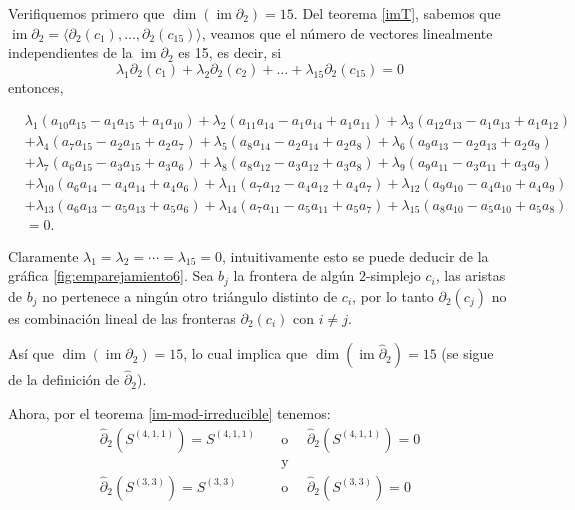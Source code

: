 \documentclass[12pt]{book}
\theoremstyle{definition}
\DeclareMathOperator{\im}{im}
\newcounter{in}
\newcounter{ini}
\begin{document}
Verifiquemos primero que $\dim(\im \partial_{2})=15$. Del teorema
\ref{imT}, sabemos que $\im \partial_{2}=\langle\partial_{2}(c_{1}),\ldots,\partial_{2}(c_{15})\rangle$,
veamos que el número de vectores linealmente independientes de la
$\im \partial_{2}$ es 15, es decir, si
$$\lambda_{1}\partial_{2}(c_{1})+\lambda_{2}\partial_{2}(c_{2})+\ldots+\lambda_{15}\partial_{2}(c_{15})=0$$
entonces,
\begin{footnotesize}
  \begin{align*}
    &\lambda_{1}(a_{10}a_{15}-a_{1}a_{15}+a_{1}a_{10})+\lambda_{2}(a_{11}a_{14}-a_{1}a_{14}+a_{1}a_{11})+\lambda_{3}(a_{12}a_{13}-a_{1}a_{13}+a_{1}a_{12})\\
    &+\lambda_{4}(a_{7}a_{15}-a_{2}a_{15}+a_{2}a_{7})+\lambda_{5}(a_{8}a_{14}-a_{2}a_{14}+a_{2}a_{8})+\lambda_{6}(a_{9}a_{13}-a_{2}a_{13}+a_{2}a_{9})\\
    &+\lambda_{7}(a_{6}a_{15}-a_{3}a_{15}+a_{3}a_{6})+\lambda_{8}(a_{8}a_{12}-a_{3}a_{12}+a_{3}a_{8})+\lambda_{9}(a_{9}a_{11}-a_{3}a_{11}+a_{3}a_{9})\\
    &+\lambda_{10}(a_{6}a_{14}-a_{4}a_{14}+a_{4}a_{6})+\lambda_{11}(a_{7}a_{12}-a_{4}a_{12}+a_{4}a_{7})+\lambda_{12}(a_{9}a_{10}-a_{4}a_{10}+a_{4}a_{9})\\
    &+\lambda_{13}(a_{6}a_{13}-a_{5}a_{13}+a_{5}a_{6})+\lambda_{14}(a_{7}a_{11}-a_{5}a_{11}+a_{5}a_{7})+\lambda_{15}(a_{8}a_{10}-a_{5}a_{10}+a_{5}a_{8})\\
    &=0.
  \end{align*}
\end{footnotesize}
Claramente $\lambda_{1}=\lambda_{2}=\cdots=\lambda_{15}=0$,
intuitivamente esto se puede deducir de la gráfica
\ref{fig:emparejamiento6}. Sea $b_{j}$ la frontera de algún $2$-simplejo $c_{i}$, las aristas
de $b_{j}$ no pertenece a ningún otro triángulo distinto de $c_{i}$, por
lo tanto $\partial_{2}(c_{j})$ no es combinación lineal de las fronteras
$\partial_{2}(c_{i})$ con $i\neq j$.

Así que $\dim(\im\partial_{2})=15$, lo cual implica que
$\dim(\im\widehat\partial_{2})=15$ (se sigue de la definición de
$\widehat\partial_{2}$).

Ahora, por el teorema \ref{im-mod-irreducible} tenemos:
\begin{align*}
  \widehat\partial_{2}(S^{(4,1,1)})=S^{(4,1,1)} \quad &\mbox{o }\quad \widehat\partial_{2}(S^{(4,1,1)})=0\\
  &\mbox{y}\\
  \widehat\partial_{2}(S^{(3,3)})=S^{(3,3)} \quad &\mbox{o }\quad \widehat\partial_{2}(S^{(3,3)})=0
\end{align*}
\end{document}
